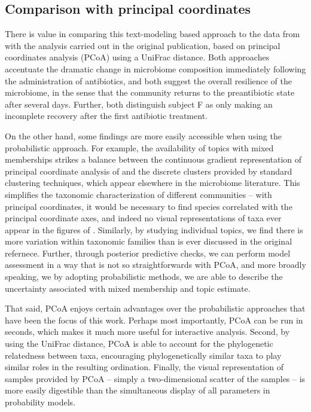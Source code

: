\documentclass[oupdraft]{bio}
\begin{document}
\subsection{Comparison with principal coordinates}
\label{subsec:comparison_with_pcoa}

There is value in comparing this text-modeling based approach to the data from
\citep{dethlefsen2011incomplete} with the analysis carried out in the original
publication, based on principal coordinates analysis (PCoA) using a UniFrac
distance. Both approaches accentuate the dramatic change in microbiome
composition immediately following the administration of antibiotics, and both
suggest the overall resilience of the microbiome, in the sense that the
community returns to the preantibiotic state after several days. Further, both
distinguish subject F as only making an incomplete recovery after the first
antibiotic treatment.

On the other hand, some findings are more easily accessible when using the
probabilistic approach. For example, the availability of topics with mixed
memberships strikes a balance between the continuous gradient representation of
principal coordinate analysis of \citep{dethlefsen2011incomplete} and the
discrete clusters provided by standard clustering techniques, which appear
elsewhere in the microbiome literature. This simplifies the taxonomic
characterization of different communities -- with principal coordinates, it
would be necessary to find species correlated with the principal coordinate
axes, and indeed no visual representations of taxa ever appear in the figures of
\cite{dethlefsen2011incomplete}. Similarly, by studying individual topics, we
find there is more variation within taxonomic families than is ever discussed in
the original refernece. Further, through posterior predictive checks, we can
perform model assessment in a way that is not so straightforwards with PCoA, and
more broadly speaking, we by adopting probabilistic methods, we are able to
describe the uncertainty associated with mixed membership and topic estimate.

That said, PCoA enjoys certain advantages over the probabilistic approaches that
have been the focus of this work. Perhaps most importantly, PCoA can be run in
seconds, which makes it much more useful for interactive analysis. Second, by
using the UniFrac distance, PCoA is able to account for the phylogenetic
relatedness between taxa, encouraging phylogenetically similar taxa to play
similar roles in the resulting ordination. Finally, the visual representation of
samples provided by PCoA -- simply a two-dimensional scatter of the samples --
is more easily digestible than the simultaneous display of all parameters in
probability models.
\end{document}

